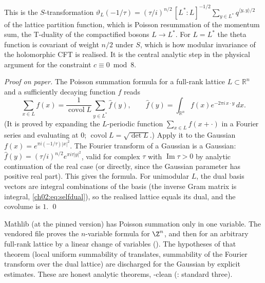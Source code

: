 \begin{physics}
This is the $S$-transformation $\vartheta_L(-1/\tau)=(\tau/i)^{n/2}\,[L^*:L]^{-1/2}\sum_{y\in L^*}q^{\langle y,y\rangle/2}$ of the lattice partition function, which is Poisson resummation of the momentum sum, the T-duality of the compactified bosons $L\to L^*$. For $L=L^*$ the theta function is covariant of weight $n/2$ under $S$, which is how modular invariance of the holomorphic CFT is realised. It is the central analytic step in the physical argument for the constraint $c\equiv0\bmod8$.
\end{physics}
\emph{Proof on paper.}  The Poisson summation formula for a full-rank lattice $L\subset\mathbb{R}^n$
and a sufficiently decaying function $f$ reads
\begin{equation*}
\sum_{x\in L}f(x)=\frac1{\operatorname{covol}L}\sum_{y\in L^*}\hat f(y),\qquad
\hat f(y)=\int_{\mathbb{R}^n}f(x)e^{-2\pi i\,x\cdot y}\,dx .
\end{equation*}
(It is proved by expanding the $L$-periodic function $\sum_{x\in L}f(x+\cdot)$ in a Fourier series
and evaluating at $0$; $\operatorname{covol}L=\sqrt{\det L}$.)  Apply it to the Gaussian
$f(x)=e^{\pi i(-1/\tau)|x|^2}$.  The Fourier transform of a Gaussian is a Gaussian:
$\hat f(y)=(\tau/i)^{n/2}e^{\pi i\tau|y|^2}$, valid for complex $\tau$ with
$\operatorname{Im}\tau>0$ by analytic continuation of the real case (or directly, since the
Gaussian parameter has positive real part).  This gives the formula.  For unimodular $L$, the
dual basis vectors are integral combinations of the basis (the inverse Gram matrix is integral,
\eqref{ch02:eq:selfdual}), so the realised lattice equals its dual, and the covolume is $1$. \qed

\begin{warning}[title={What had to be built: multivariable Poisson summation}]
Mathlib (at the pinned version) has Poisson summation only in one variable.  The vendored file
 proves the $n$-variable formula for $\Z^n$, and then
for an arbitrary full-rank lattice by a linear change of variables ().
The hypotheses of that theorem (local uniform summability of translates, summability of the
Fourier transform over the dual lattice) are discharged for the Gaussian by explicit
estimates.  These are honest analytic theorems, -clean
(: standard three).
\end{warning}

